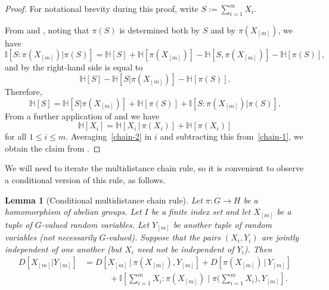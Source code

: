 \documentclass[10pt,a4paper]{article}
\newtheorem{lemma}[theorem]{Lemma}
\newcommand{\lean}[1]{}
\newcommand{\uses}[1]{}
\newcommand{\leanok}{}
\newcommand{\bbH}{\mathbb{H}}
\newcommand{\bbI}{\mathbb{I}}
\begin{document}
  \begin{proof}\uses{conditional-mutual-alt, relabeled-entropy, chain-rule}\leanok For notational brevity during this proof, write $S := \sum_{i=1}^m X_i$.

    From  and , noting that $\pi(S)$ is determined both by $S$ and by $\pi(X_{[m]})$, we have
  \begin{equation*}
   \bbI[S:\pi(X_{[m]})|\pi(S)] = \bbH[S]+\bbH[\pi(X_{[m]})]-\bbH[S,\pi(X_{[m]})]-\bbH[\pi(S)],
  \end{equation*}
  and by  the right-hand side is equal to
  \begin{equation*}
  \bbH[S]-\bbH[S|\pi(X_{[m]})]-\bbH[\pi(S)].
  \end{equation*}
  Therefore,
  \begin{equation}\label{chain-1}
  \bbH[S]=\bbH[S|\pi(X_{[m]})]+\bbH[\pi(S)]+\bbI[S:\pi(X_{[m]})|\pi(S)]. \end{equation}
  From a further application of  and  we have
  \begin{equation}\label{chain-2}
    \bbH[X_i] = \bbH[X_i \, | \, \pi(X_i)] + \bbH[\pi(X_i)]
  \end{equation}
  for all $1 \leq i \leq m$.  Averaging~\eqref{chain-2} in $i$ and subtracting this from~\eqref{chain-1}, we obtain the claim from .
  \end{proof}

  We will need to iterate the multidistance chain rule, so it is convenient to observe a conditional version of this rule, as follows.

  \begin{lemma}[Conditional multidistance chain rule]\label{multidist-chain-rule-cond}\lean{cond_multiDist_chainRule}\leanok
    Let $\pi \colon G \to H$ be a homomorphism of abelian groups.
    Let $I$ be a finite index set and let $X_{[m]}$ be a tuple of $G$-valued random variables.
    Let $Y_{[m]}$ be another tuple of random variables (not necessarily $G$-valued).
    Suppose that the pairs $(X_i, Y_i)$ are jointly independent of one another (but $X_i$ need not be independent of $Y_i$).
    Then
    \begin{align}\nonumber
        D[ X_{[m]} | Y_{[m]} ] &=  D[ X_{[m]} \,|\, \pi(X_{[m]}), Y_{[m]}] + D[ \pi(X_{[m]}) \,|\, Y_{[m]}] \\
         &\quad\qquad + \bbI[ \sum_{i=1}^m X_i : \pi(X_{[m]}) \; \big| \;  \pi\bigl(\sum_{i=1}^m X_i \bigr), Y_{[m]} ].\label{chain-eq-cond}
    \end{align}
  \end{lemma}
\end{document}

